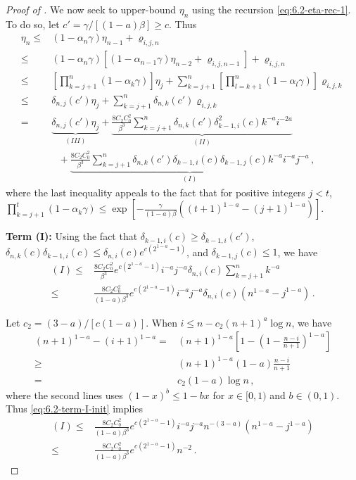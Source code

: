 \documentclass[10pt,a4paper]{amsart}
\begin{document}
\begin{proof}[Proof of ]
We now seek to upper-bound $\eta_n$ using the recursion \eqref{eq:6.2-eta-rec-1}. To do so, let $c'=\gamma/[(1-a)\beta]\ge c$. Thus
\begin{align}
\eta_n \le & (1-\alpha_{n}\gamma)\eta_{n-1}+\varrho_{i,j,n}\nonumber\\
\le & (1-\alpha_{n}\gamma)\left[(1-\alpha_{n-1}\gamma)\eta_{n-2}+\varrho_{i,j,n-1}\right]+\varrho_{i,j,n}\nonumber\\
\le & \left[\prod_{k=j+1}^n(1-\alpha_k\gamma)\right] \eta_j + \sum_{k=j+1}^{n} \left[\prod_{l=k+1}^n(1-\alpha_l\gamma)\right] \varrho_{i,j,k}\nonumber\\
\le & \delta_{n,j}(c')\eta_j+
\sum_{k=j+1}^{n} \delta_{n,k}(c')\varrho_{i,j,k}\nonumber\\
=& \underbrace{\delta_{n,j}(c')\eta_j}_{(III)}+
\underbrace{\frac{8C_2C_0^2}{\beta^3}\sum_{k=j+1}^{n} \delta_{n,k}(c')\delta_{k-1,i}^2(c) k^{-a}i^{-2a}}_{(II)}\nonumber\\
&~~~+\underbrace{\frac{8C_2C_0^2}{\beta^3}\sum_{k=j+1}^{n} \delta_{n,k}(c')\delta_{k-1,i}(c)\delta_{k-1,j}(c) k^{-a}i^{-a}j^{-a}}_{(I)}\,,\label{eq:6.2-eta-rec-3}
\end{align}
where the last inequality appeals to the fact that for positive integers $j<t$, $\prod_{k=j+1}^t (1-\alpha_k \gamma)\le \exp\left[-\frac{\gamma}{(1-a)\beta}\left((t+1)^{1-a}-(j+1)^{1-a}\right)\right]$.

\textbf{Term (I):} Using the fact that $\delta_{k-1,i}(c)\ge \delta_{k-1,i}(c')$, $\delta_{n,k}(c)\delta_{k-1,i}(c)\le \delta_{n,i}(c)e^{c(2^{1-a}-1)}$, and $\delta_{k-1,j}(c)\le 1$, we have
\begin{align}
    (I)\le & \frac{8C_2C_0^2}{\beta^3}e^{c(2^{1-a}-1)}i^{-a}j^{-a}\delta_{n,i}(c)\sum_{k=j+1}^n k^{-a}\nonumber\\
    \le & \frac{8C_2C_0^2}{(1-a)\beta^3}e^{c(2^{1-a}-1)}i^{-a}j^{-a}\delta_{n,i}(c)(n^{1-a}-j^{1-a})\,.\label{eq:6.2-term-I-init}
\end{align}


Let $c_2=(3-a)/[c(1-a)]$.
When $i\le n-c_2 (n+1)^a \log n$, we have
\begin{align*}
  (n+1)^{1-a}-(i+1)^{1-a} = & (n+1)^{1-a}\left[1-\left(1-\frac{n-i}{n+1}\right)^{1-a}\right]\\
  \ge & (n+1)^{1-a}(1-a)\frac{n-i}{n+1}\\
  = & c_2(1-a) \log n\,,
\end{align*}
where the second lines uses $(1-x)^b\le 1-bx$ for $x\in[0,1)$ and $b\in(0,1)$. Thus 
\eqref{eq:6.2-term-I-init} implies
\begin{align}
   (I)\le & \frac{8 C_2C_0^2 }{(1-a)\beta^3}e^{c(2^{1-a}-1)}i^{-a}j^{-a}n^{-(3-a)}(n^{1-a}-j^{1-a})\nonumber \\
    \le & \frac{8 C_2C_0^2 }{(1-a)\beta^3}e^{c(2^{1-a}-1)} n^{-2}\,.  \label{eq:6.2-term-I-small-i}
\end{align}


\end{proof}
\end{document}
